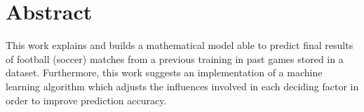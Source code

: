 

\chapter{Abstract}\label{sec:abstract}
This work explains and builds a mathematical model able to predict final results of football (soccer) matches from a previous training in past games stored in a dataset. Furthermore, this work suggests an implementation of a machine learning algorithm which adjusts the influences involved in each deciding factor in order to improve prediction accuracy.



